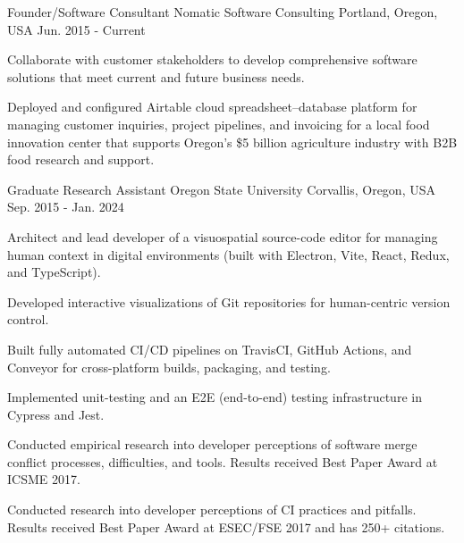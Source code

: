 
\begin{cventries}

\cventry
    {Founder/Software Consultant} %
    {Nomatic Software Consulting} %
    {Portland, Oregon, USA} %
    {Jun. 2015 - Current} %
    {
      \begin{cvitems} %
        \item {Collaborate with customer stakeholders to develop comprehensive software solutions that meet current and future business needs.}
        \item {Deployed and configured Airtable cloud spreadsheet--database platform for managing customer inquiries, project pipelines, and invoicing for a local food innovation center that supports Oregon's \$5 billion agriculture industry with B2B food research and support.}
      \end{cvitems}
    }
    
  \cventry
    {Graduate Research Assistant} %
    {Oregon State University} %
    {Corvallis, Oregon, USA} %
    {Sep. 2015 - Jan. 2024} %
    {
      \begin{cvitems} %
        \item {Architect and lead developer of a visuospatial source-code editor for managing human context in digital environments (built with Electron, Vite, React, Redux, and TypeScript).}
        \item {Developed interactive visualizations of Git repositories for human-centric version control.}
        \item {Built fully automated CI/CD pipelines on TravisCI, GitHub Actions, and Conveyor for cross-platform builds, packaging, and testing.}
        \item {Implemented unit-testing and an E2E (end-to-end) testing infrastructure in Cypress and Jest.}
        \item {Conducted empirical research into developer perceptions of software merge conflict processes, difficulties, and tools. Results received Best Paper Award at ICSME 2017.}
        \item {Conducted research into developer perceptions of CI practices and pitfalls. Results received Best Paper Award at ESEC/FSE 2017 and has 250+ citations.}
      \end{cvitems}
    }


\end{cventries}
